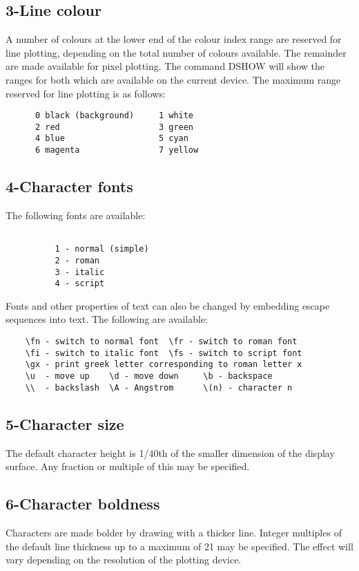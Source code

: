 \documentclass{book}
\renewcommand{\_}{{\tt\char'137}}     %
\begin{document}
\subsection{3-Line colour}
A number of colours at the lower end of the colour index range
are reserved for line plotting, depending on the total number
of colours available. The remainder are made available for
pixel plotting. The command DSHOW will show the ranges for
both which are available on the current device. The maximum
range reserved for line plotting is as follows:
\begin{verbatim}
      0 black (background)     1 white
      2 red                    3 green
      4 blue                   5 cyan
      6 magenta                7 yellow
\end{verbatim}
\subsection{4-Character fonts}
The following fonts are available:
\begin{verbatim}
 
          1 - normal (simple)
          2 - roman
          3 - italic
          4 - script
\end{verbatim}
Fonts and other properties of text can also be changed by
embedding escape sequences into text. The following are
available:
\begin{verbatim}
    \fn - switch to normal font  \fr - switch to roman font
    \fi - switch to italic font  \fs - switch to script font
    \gx - print greek letter corresponding to roman letter x
    \u  - move up    \d - move down     \b - backspace
    \\  - backslash  \A - Angstrom      \(n) - character n
\end{verbatim}
\subsection{5-Character size}
The default character height is 1/40th of the smaller dimension
of the display surface. Any fraction or multiple of this may be
specified.
 
\subsection{6-Character boldness}
Characters are made bolder by drawing with a thicker line.
Integer multiples of the default line thickness up to a
maximum of 21 may be specified. The effect will vary
depending on the resolution of the plotting device.
 
\end{document}

